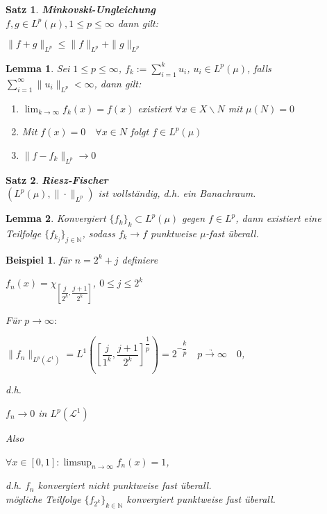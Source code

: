 \documentclass[11pt]{memoir}
\theoremstyle{changebreak}
\newtheorem{Beispiel}{Beispiel}[chapter]
\newtheorem{Lemma}{Lemma}[chapter]
\newtheorem{Satz}{Satz}[chapter]
\begin{document}
\begin{Satz}
\emph{\textbf{Minkovski-Ungleichung}} \\
$f, g \in L^p(\mu), 1 \leq p \leq \infty$ dann gilt:
\begin{center}
	$\|f+g\|_{L^p} \leq \|f\|_{L^p} + \|g\|_{L^p}$
\end{center}
\end{Satz}

\begin{Lemma}
Sei $1 \leq p \leq \infty$, $f_k := \sum\limits_{i=1}^k u_i$, $u_i \in L^p(\mu)$, falls $\sum\limits_{i=1}^\infty \|u_i\|_{L^p} < \infty$, dann gilt:
\begin{enumerate}
	\item $\lim_{k \rightarrow \infty} f_k (x) = f(x)$ existiert $\forall x \in X\backslash N$ mit $\mu(N) =0$
	\item Mit $f(x) = 0\quad \forall x \in N$ folgt $f \in L^p(\mu)$
	\item $\|f-f_k\|_{L^p} \rightarrow 0$
\end{enumerate}
\end{Lemma}





\begin{Satz}
\emph{\textbf{Riesz-Fischer}} \\
$\left(L^p(\mu), \|\cdotp\|_{L^p}\right)$ ist vollständig, d.h. ein Banachraum.
\end{Satz}

\begin{Lemma}
Konvergiert $\{f_k\}_k \subset L^p (\mu)$ gegen $f \in L^p$, dann existiert eine Teilfolge $\{f_{k_j}\}_{j \in \mathbb N}$, sodass $f_k \rightarrow f$ punktweise $\mu$-fast überall.
\end{Lemma}

\begin{Beispiel}
für $n = 2^k + j$ definiere 
\begin{center}
	$f_n(x) = \chi_{\left[\dfrac{j}{2^k}, \dfrac{j+1}{2^k}\right]}$, $0 \leq j \leq 2^k$ 
\end{center}
Für $p \rightarrow \infty: $
\begin{center}
	$\|f_n\|_{L^p(\mathscr L^1)} = L^1\left(\left[\dfrac{j}{1^k}, \dfrac{j+1}{2^k} \right] ^{\dfrac{1}{p}} \right) = 2^{-\dfrac{k}{p}} \quad \underrightarrow{p \rightarrow \infty} \quad  0$, 
\end{center}
d.h. 
\begin{center}
	$f_n \rightarrow 0$ in $L^p(\mathscr L^1)$ 
\end{center}
Also 
\begin{center}
	$\forall x \in [0, 1]: \limsup_{n \rightarrow \infty} f_n (x) = 1$,
\end{center} 
d.h. $f_n$ konvergiert nicht punktweise fast überall. \\
mögliche Teilfolge $\{f_{2^k}\}_{k \in \mathbb N}$ konvergiert punktweise fast überall.
\end{Beispiel}
\end{document}
